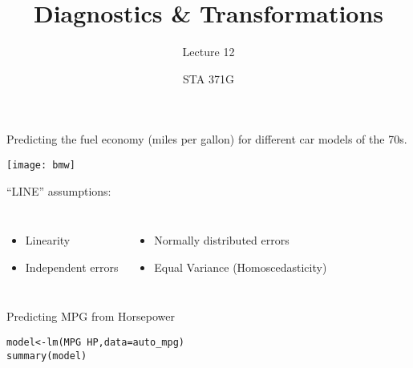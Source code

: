 \documentclass{beamer}\usepackage[]{graphicx}\usepackage[]{color}
\title{Diagnostics \& Transformations}
\subtitle{Lecture 12}
\author{STA 371G}
\makeatletter
\newcommand{\hlopt}[1]{\textcolor[rgb]{1,0.894,0.769}{#1}}%
\newcommand{\hlstd}[1]{\textcolor[rgb]{1,0.894,0.769}{#1}}%
\newcommand{\hlkwb}[1]{\textcolor[rgb]{0.804,0.776,0.451}{#1}}%
\newcommand{\hlkwc}[1]{\textcolor[rgb]{0.78,0.941,0.545}{#1}}%
\newcommand{\hlkwd}[1]{\textcolor[rgb]{1,0.78,0.769}{#1}}%
\newenvironment{kframe}{%
 \def\at@end@of@kframe{}%
 \ifinner\ifhmode%
  \def\at@end@of@kframe{\end{minipage}}%
  \begin{minipage}{\columnwidth}%
 \fi\fi%
 \def\FrameCommand##1{\hskip\@totalleftmargin \hskip-\fboxsep
 \colorbox{shadecolor}{##1}\hskip-\fboxsep
     \hskip-\linewidth \hskip-\@totalleftmargin \hskip\columnwidth}%
 \MakeFramed {\advance\hsize-\width
   \@totalleftmargin\z@ \linewidth\hsize
   \@setminipage}}%
 {\par\unskip\endMakeFramed%
 \at@end@of@kframe}
\newenvironment{knitrout}{}{} %
\makeatother
\begin{document}
  
  

  \frame{\maketitle}



  \begin{darkframes}
    
    
    \begin{frame}
      \fontsize{9}{9}\selectfont
      Predicting the fuel economy (miles per gallon) for different car models of the 70s.
      
      \begin{center}
        \texttt{[image: bmw]} \\
      \end{center} \pause
      
      ``LINE'' assumptions:
      \begin{columns}[onlytextwidth]
          \begin{itemize}
            \item Linearity
            \item Independent errors
          \end{itemize}
          \begin{itemize}
            \item Normally distributed errors
            \item Equal Variance (Homoscedasticity)
          \end{itemize}
      \end{columns}
    \end{frame}
    
    
    
    \begin{frame}[fragile]{Predicting MPG from Horsepower}
    \fontsize{9}{9}\selectfont
\begin{knitrout}
\begin{kframe}
\begin{alltt}
  \hlstd{model}\hlkwb{<-}\hlkwd{lm}\hlstd{(MPG} \hlopt{~} \hlstd{HP,} \hlkwc{data}\hlstd{=auto_mpg)}
  \hlkwd{summary}\hlstd{(model)}
\end{alltt}
\begin{verbatim}


\end{verbatim}
\end{kframe}
\end{knitrout}
\end{frame}
\end{darkframes}
\end{document}
